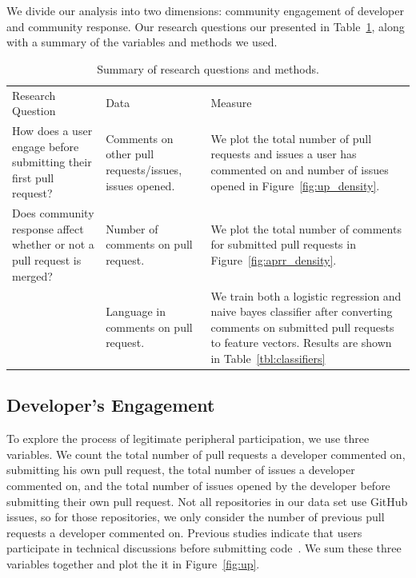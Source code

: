 \documentclass{sigchi}
\begin{document}
We divide our analysis into two dimensions: community engagement of developer and
community response. Our research questions our presented in
Table~\ref{tbl:research_questions}, along with a summary of the variables and
methods we used.

\begin{table}[ht] \centering
\caption{Summary of research questions and methods.}
\label{tbl:research_questions}
\begin{tabular}{ p{2.1in} p{2.1in} p{2.3in} }
\hline\hline
Research Question
& Data                                  & Measure
\\
How does a user engage before submitting their first pull request?  &
Comments on other pull requests/issues, issues opened.      & We plot the total
number of pull requests and issues a user has commented on and number of issues
opened in Figure~\ref{fig:up_density}.
\\
Does community response affect whether or not a pull request is
merged? & Number of comments on pull request.   & We plot the
total number of comments for submitted pull requests in
Figure~\ref{fig:aprr_density}.
\\
~
& Language in comments on pull request. & We train both a
logistic regression and naive bayes classifier after
converting comments on submitted pull requests to feature
vectors. Results are shown in
Table~\ref{tbl:classifiers} \\
\hline
\end{tabular}
\end{table}

\subsection{Developer's Engagement}
To explore the process of legitimate peripheral participation, we use three
variables. We count the
total number of pull requests a developer commented on, submitting his own
pull request, the total number of issues a developer commented on, and the total
number of issues opened by the developer before submitting their own pull
request. Not all repositories in our data set use GitHub issues, so for those
repositories, we only consider the number of previous pull requests a developer
commented on. Previous studies indicate that users participate in technical
discussions before submitting code~\cite{von_krogh_community_2003}. We sum these
three variables together and plot the it in Figure~\ref{fig:up}.
\end{document}
